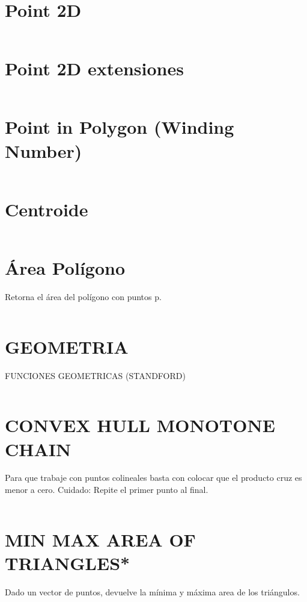 \documentclass{article}
\begin{document}
\section*{Point 2D}
\inputminted[]{c++}{algorithms/P2D.cpp}
\newpage

\section*{Point 2D extensiones}
\inputminted[]{c++}{algorithms/P2D2.cpp}
\newpage

\section*{Point in Polygon (Winding Number)}
\inputminted[]{c++}{algorithms/POINTINPOLYGON.cpp}
\newpage

\section*{Centroide}
\inputminted[]{c++}{algorithms/CENTROIDE.cpp}
\newpage

\section*{\'Area Pol\'igono}
Retorna el \'area del pol\'igono con puntos p.
\inputminted[]{c++}{algorithms/AREAPOLYGON.cpp}
\newpage

\section*{GEOMETRIA}
FUNCIONES GEOMETRICAS (STANDFORD)
\inputminted[]{c++}{algorithms/GEOMETRY.cpp}
\newpage


\section*{CONVEX HULL MONOTONE CHAIN}
Para que trabaje con puntos colineales basta con colocar que el producto cruz es menor a cero.
Cuidado: Repite el primer punto al final.
\inputminted[]{c++}{algorithms/CONVEXHULLMC.cpp}
\newpage

\section*{MIN MAX AREA OF TRIANGLES*}
Dado un vector de puntos, devuelve la m\'inima y m\'axima area de los tri\'angulos.
\inputminted[]{c++}{algorithms/Triangles.cpp}
\newpage
\end{document}
